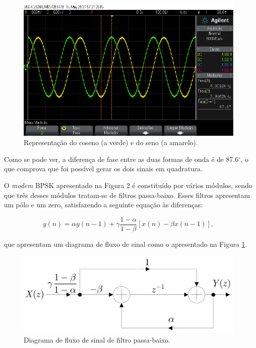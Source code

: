 \documentclass[11pt]{article}
\numberwithin{equation}{section}
\begin{document}
\begin{figure}[H]
	\centering
	\includegraphics[keepaspectratio=true, scale=0.37]{exps/SinVsCos}
	\caption{Representação do coseno (a verde) e do seno (a amarelo).}
	\vspace{-0.8em}
\end{figure}

Como se pode ver, a diferença de fase entre as duas formas de onda é de 87.6$^{\circ}$, o que comprova que foi possível gerar os dois sinais em quadratura.

O \textit{modem} BPSK apresentado na Figura 2 é constituído por vários módulos, sendo que três desses módulos tratam-se de filtros passa-baixo. Esses filtros apresentam um pólo e um zero, satisfazendo a seguinte equação às diferenças:

\vspace{-3mm}
\begin{equation}
y(n) = \alpha y(n-1) + \gamma \frac{1-\alpha}{1-\beta}[x(n)-\beta x(n-1)],
\end{equation} 

\vspace{1mm}
que apresentam um diagrama de fluxo de sinal como o apresentado na Figura \ref{fig:fluxo}.

\begin{figure}[H]
	\centering
	\includegraphics[keepaspectratio=true, scale=0.20]{teoricas/diagrama_fluxo}
	\caption{Diagrama de fluxo de sinal de filtro passa-baixo.}
	\label{fig:fluxo}
	\vspace{-0.8em}
\end{figure}
\end{document}
